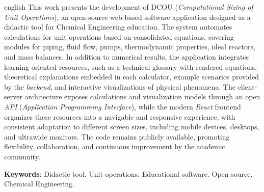 \documentclass[
  12pt,        %
  openright,      %
  twoside,      %
  a4paper,      %
  english,      %
  brazil        %
  ]{abntex2}
\begin{document}
\begin{resumo}[Abstract]
 \begin{otherlanguage*}{english}
This work presents the development of DCOU (\textit{Computational Sizing of Unit Operations}), an open-source web-based software application designed as a didactic tool for Chemical Engineering education. The system automates calculations for unit operations based on consolidated equations, covering modules for piping, fluid flow, pumps, thermodynamic properties, ideal reactors, and mass balances. In addition to numerical results, the application integrates learning-oriented resources, such as a technical glossary with rendered equations, theoretical explanations embedded in each calculator, example scenarios provided by the \textit{backend}, and interactive visualizations of physical phenomena. The client-server architecture exposes calculations and visualization models through an open \textit{API} (\textit{Application Programming Interface}), while the modern \textit{React} frontend organizes these resources into a navigable and responsive experience, with consistent adaptation to different screen sizes, including mobile devices, desktops, and ultrawide monitors. The code remains publicly available, promoting flexibility, collaboration, and continuous improvement by the academic community.

   \vspace{\onelineskip}
   \noindent
   \textbf{Keywords}: Didactic tool. Unit operations. Educational software. Open source. Chemical Engineering.
 \end{otherlanguage*}
\end{resumo}

\listoffigures*
\cleardoublepage

\listoftables*
\cleardoublepage
\end{document}
